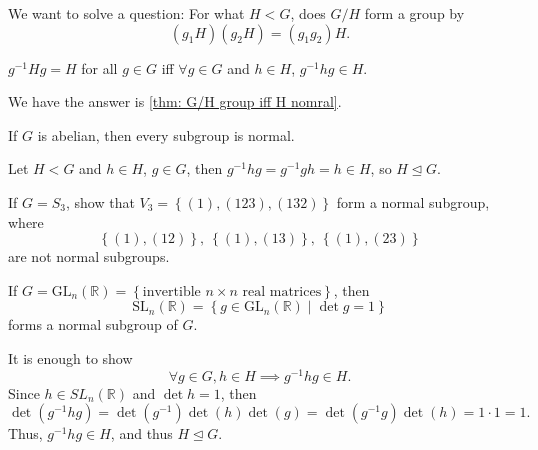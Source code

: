\begin{prev}
    We want to solve a question: For what \(H < G\), does \(G / H\) form a group by 
    \[
        (g_1 H)(g_2 H) = (g_1 g_2)H.
    \]  
    \begin{note}
        \(g^{-1} H g = H \) for all \(g \in G\) iff \(\forall g \in G\) and \(h \in H\), \(g^{-1} h g \in H\).      
    \end{note}
    We have the answer is \autoref{thm: G/H group iff H nomral}.
\end{prev}

\begin{eg}
    If \(G\) is abelian, then every subgroup is normal. 
\end{eg}
\begin{explanation}
    Let \(H < G\) and \(h \in H\), \(g \in G\), then \(g^{-1} h g = g^{-1} g h = h \in H\), so \(H \trianglelefteq G\).     
\end{explanation}

\begin{eg}
    If \(G = S_3\), show that \(V_3 = \left\{ (1), (123), (132) \right\} \) form a normal subgroup, where 
    \[
        \left\{ (1), (12) \right\}, \ \left\{ (1), (13) \right\}, \ \left\{ (1), (23) \right\}   
    \] are not normal subgroups. 
\end{eg}

\begin{eg}
    If \(G = \mathrm{GL}_n(\mathbb{R}) = \left\{ \text{invertible } n\times n \text{ real matrices} \right\} \), then
    \[
        \mathrm{SL}_n(\mathbb{R} ) = \left\{ g \in \mathrm{GL}_n(\mathbb{R} ) \mid \det g = 1 \right\}  
    \]
    forms a normal subgroup of \(G\).    
\end{eg}
\begin{explanation}
    It is enough to show 
    \[
        \forall g \in G, h \in H \implies g^{-1} h g \in H.
    \]Since \(h \in SL_n(\mathbb{R} )\) and \(\det h = 1\), then 
    \[
        \det \left( g^{-1} h g  \right) = \det \left( g^{-1} \right) \det (h) \det (g) = \det \left( g^{-1} g  \right) \det (h) = 1 \cdot 1 = 1. 
    \] Thus, \(g^{-1} h g \in H \), and thus \(H \trianglelefteq G\).  
\end{explanation}

